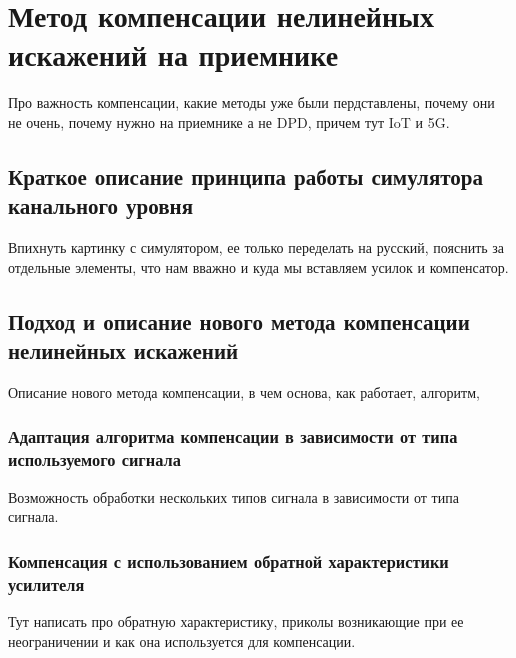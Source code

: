 \section{Метод компенсации нелинейных искажений на приемнике}
Про важность компенсации, какие методы уже были пердставлены, почему они не
очень, почему нужно на приемнике а не DPD, причем тут IoT и 5G.

\subsection{Краткое описание принципа работы симулятора канального уровня}
Впихнуть картинку с симулятором, ее только переделать на русский, пояснить
за отдельные элементы, что нам вважно и куда мы вставляем усилок и
компенсатор.

\subsection{Подход и описание нового метода компенсации нелинейных искажений}
Описание нового метода компенсации, в чем основа, как работает, алгоритм,

\subsubsection{Адаптация алгоритма компенсации в зависимости от типа используемого сигнала}
Возможность обработки нескольких типов сигнала в зависимости от типа
сигнала.

\subsubsection{Компенсация с использованием обратной характеристики усилителя}
Тут написать про обратную характеристику, приколы возникающие при ее
неограничении и как она используется для компенсации.